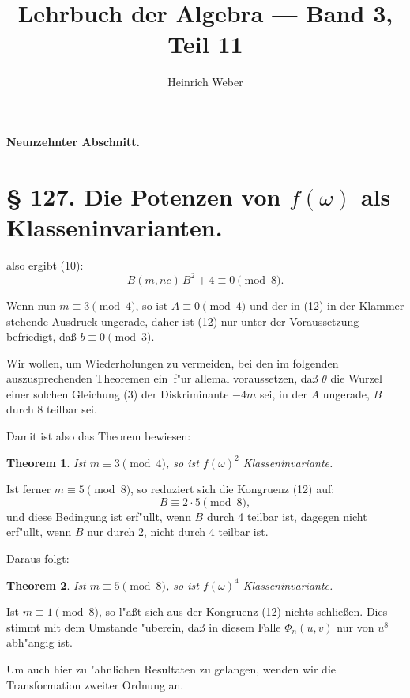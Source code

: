 \documentclass[12pt,a4paper]{article}
\title{Lehrbuch der Algebra --- Band 3, Teil 11}
\author{Heinrich Weber}
\date{}
\theoremstyle{plain}
\newtheorem{theorem}{Theorem}[section]
\theoremstyle{definition}
\theoremstyle{remark}
\begin{document}
\maketitle

\noindent\textbf{Neunzehnter Abschnitt.}


\section*{\S{} 127. Die Potenzen von $f(\omega)$ als Klasseninvarianten.}

also ergibt (10):
\begin{equation}\label{eq:12}
B(m, nc)\, B^2 + 4 \equiv 0 \pmod{8}.
\end{equation}

Wenn nun $m \equiv 3 \pmod{4}$, so ist $A \equiv 0 \pmod{4}$ und der in (12) in der Klammer stehende Ausdruck ungerade, daher ist (12) nur unter der Voraussetzung befriedigt, da\ss{} $b \equiv 0 \pmod{3}$.

Wir wollen, um Wiederholungen zu vermeiden, bei den im folgenden auszusprechenden Theoremen ein~f"ur allemal voraussetzen, da\ss{} $\theta$ die Wurzel einer solchen Gleichung (3) der Diskriminante $-4m$ sei, in der $A$ ungerade, $B$ durch 8 teilbar sei.

Damit ist also das Theorem bewiesen:

\begin{theorem}
Ist $m \equiv 3 \pmod{4}$, so ist $f(\omega)^2$ Klasseninvariante.
\end{theorem}

Ist ferner $m \equiv 5 \pmod{8}$, so reduziert sich die Kongruenz (12) auf:
\[
B \equiv 2 \cdot 5 \pmod{8},
\]
und diese Bedingung ist erf"ullt, wenn $B$ durch 4 teilbar ist, dagegen nicht erf"ullt, wenn $B$ nur durch 2, nicht durch 4 teilbar ist.

Daraus folgt:

\begin{theorem}
Ist $m \equiv 5 \pmod{8}$, so ist $f(\omega)^4$ Klasseninvariante.
\end{theorem}

Ist $m \equiv 1 \pmod{8}$, so l"a\ss{}t sich aus der Kongruenz (12) nichts schlie\ss{}en. Dies stimmt mit dem Umstande "uberein, da\ss{} in diesem Falle $\Phi_n(u, v)$ nur von $u^8$ abh"angig ist.

Um auch hier zu "ahnlichen Resultaten zu gelangen, wenden wir die Transformation zweiter Ordnung an.
\end{document}
